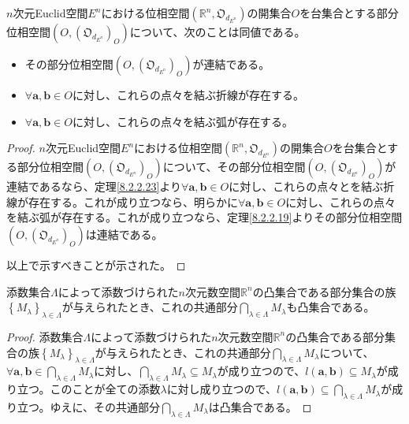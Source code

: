 \documentclass[dvipdfmx]{jsarticle}
\begin{document}
\begin{thm}\label{8.2.2.24}
$n$次元Euclid空間$E^{n}$における位相空間$\left( \mathbb{R}^{n},\mathfrak{O}_{d_{E^{n}}} \right)$の開集合$O$を台集合とする部分位相空間$\left( O,\left( \mathfrak{O}_{d_{E^{n}}} \right)_{O} \right)$について、次のことは同値である。
\begin{itemize}
\item
  その部分位相空間$\left( O,\left( \mathfrak{O}_{d_{E^{n}}} \right)_{O} \right)$が連結である。
\item
  $\forall\mathbf{a},\mathbf{b} \in O$に対し、これらの点々を結ぶ折線が存在する。
\item
  $\forall\mathbf{a},\mathbf{b} \in O$に対し、これらの点々を結ぶ弧が存在する。
\end{itemize}
\end{thm}
\begin{proof}
$n$次元Euclid空間$E^{n}$における位相空間$\left( \mathbb{R}^{n},\mathfrak{O}_{d_{E^{n}}} \right)$の開集合$O$を台集合とする部分位相空間$\left( O,\left( \mathfrak{O}_{d_{E^{n}}} \right)_{O} \right)$について、その部分位相空間$\left( O,\left( \mathfrak{O}_{d_{E^{n}}} \right)_{O} \right)$が連結であるなら、定理\ref{8.2.2.23}より$\forall\mathbf{a},\mathbf{b} \in O$に対し、これらの点々とを結ぶ折線が存在する。これが成り立つなら、明らかに$\forall\mathbf{a},\mathbf{b} \in O$に対し、これらの点々を結ぶ弧が存在する。これが成り立つなら、定理\ref{8.2.2.19}よりその部分位相空間$\left( O,\left( \mathfrak{O}_{d_{E^{n}}} \right)_{O} \right)$は連結である。\par
以上で示すべきことが示された。
\end{proof}
\begin{thm}\label{8.2.2.25}
添数集合$\varLambda$によって添数づけられた$n$次元数空間$\mathbb{R}^{n}$の凸集合である部分集合の族$\left\{ M_{\lambda} \right\}_{\lambda \in \varLambda}$が与えられたとき、これの共通部分$\bigcap_{\lambda \in \varLambda} M_{\lambda}$も凸集合である。
\end{thm}
\begin{proof}
添数集合$\varLambda$によって添数づけられた$n$次元数空間$\mathbb{R}^{n}$の凸集合である部分集合の族$\left\{ M_{\lambda} \right\}_{\lambda \in \varLambda}$が与えられたとき、これの共通部分$\bigcap_{\lambda \in \varLambda} M_{\lambda}$について、$\forall\mathbf{a},\mathbf{b} \in \bigcap_{\lambda \in \varLambda} M_{\lambda}$に対し、$\bigcap_{\lambda \in \varLambda} M_{\lambda} \subseteq M_{\lambda}$が成り立つので、$l\left( \mathbf{a},\mathbf{b} \right) \subseteq M_{\lambda}$が成り立つ。このことが全ての添数$\lambda$に対し成り立つので、$l\left( \mathbf{a},\mathbf{b} \right) \subseteq \bigcap_{\lambda \in \varLambda} M_{\lambda}$が成り立つ。ゆえに、その共通部分$\bigcap_{\lambda \in \varLambda} M_{\lambda}$は凸集合である。
\end{proof}
\end{document}
